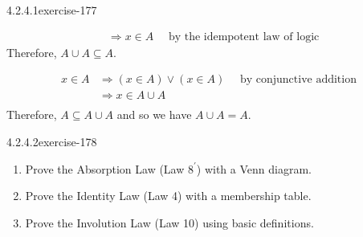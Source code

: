 \documentclass[twoside,10pt,]{book}
\numberwithin{equation}{section}
\begin{document}
\begin{divisionsolution}{4.2.4.1}{}{exercise-177}
\begin{enumerate}[label=(\alph*)]
\begin{equation*}
\begin{split}
&\Rightarrow x\in A \quad\textrm{ by the idempotent law of logic}
\end{split}
\end{equation*}
Therefore, \(A\cup A\subseteq A\).%
\par
\hypertarget{p-1597}{}%
%
\begin{equation*}
\begin{split}
x\in A &\Rightarrow (x\in A) \lor (x\in A) \quad \textrm{ by conjunctive addition}\\
& \Rightarrow  x\in A\cup A\\
\end{split}
\end{equation*}
Therefore, \(A \subseteq A\cup A\) and so we have \(A\cup A=A\).%
\end{enumerate}
%
\end{divisionsolution}%
\begin{divisionsolution}{4.2.4.2}{}{exercise-178}%
\hypertarget{p-1598}{}%
\leavevmode%
\begin{enumerate}[label=(\alph*)]
\item\hypertarget{li-845}{}Prove the Absorption Law (Law \(8^{\prime}\)) with a Venn diagram.%
\item\hypertarget{li-846}{}Prove the Identity Law (Law 4) with a membership table.%
\item\hypertarget{li-847}{}Prove the Involution Law (Law 10) using basic definitions.%
\end{enumerate}
%
\end{divisionsolution}%
\end{document}
